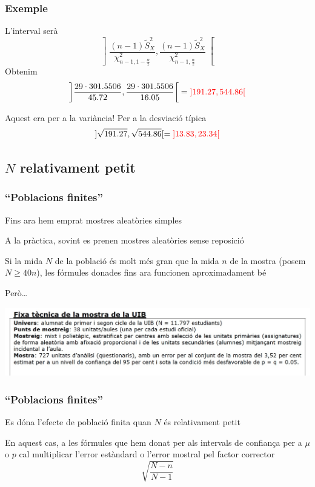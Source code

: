 \documentclass[12pt,t]{beamer}
\newcommand{\red}[1]{\textcolor{red}{#1}}
\renewcommand{\emph}[1]{{\color{red}#1}}
\renewcommand{\geq}{\geqslant}
\theoremstyle{plain}
\theoremstyle{definition}
\begin{document}
\begin{frame} 
\frametitle{Exemple}

L'interval serà
$$
\left] \frac{(n-1)\widetilde{S}_{X}^2}{\chi_{n-1,1-\frac{\alpha}{2}}^2},
\frac{(n-1)\widetilde{S}_{X}^2}{\chi_{n-1,\frac{\alpha}{2}}^2}
\right[
$$
Obtenim
$$
\left] \frac{29\cdot 301.5506}{45.72},
\frac{29\cdot 301.5506}{16.05}
\right[=
\red{]191.27, 544.86[}
$$


Aquest era per a la variància! Per a la desviació típica
$$
]\sqrt{191.27}, \sqrt{544.86}[=\red{]13.83,23.34[}
$$

\end{frame}

\subsection{$N$ relativament petit}
\begin{frame}
\frametitle{``Poblacions finites''}
Fins ara hem emprat mostres aleatòries simples
\medskip

A la pràctica, sovint es prenen mostres aleatòries sense reposició
\medskip

Si la mida $N$ de la població és molt més gran que la mida $n$ de la mostra (posem $N\geq 40n$), les fórmules donades fins ara funcionen aproximadament bé
\medskip

Però\ldots
\vspace*{-4ex}

\begin{center}
\hspace*{-0.5cm}\includegraphics[width=1.1\linewidth]{plagiUIB2.jpg}
\end{center}


\end{frame}

\begin{frame}
\frametitle{``Poblacions finites''}

Es dóna l'efecte de \emph{població finita} quan $N$ és relativament petit
\medskip

En aquest cas, a les fórmules que hem donat per als intervals de confiança per a $\mu$ o $p$ cal multiplicar l'error estàndard o l'error mostral pel factor corrector
$$
\sqrt{\frac{N-n}{N-1}}
$$

\end{frame}
\end{document}
